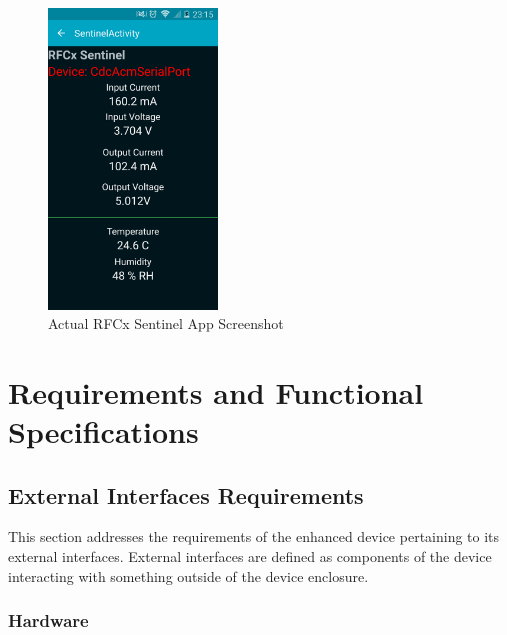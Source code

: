 \documentclass{article}
\begin{document}
{%

\begin{figure}[H]
	\centering
	\includegraphics[width=0.4\textwidth]{RFCxSentinelScreenshot}
	\caption{Actual RFCx Sentinel App Screenshot}
	\label{fig:sentscrn}
\end{figure}
\section{Requirements and Functional Specifications}
\subsection{External Interfaces Requirements}
This section addresses the requirements of the enhanced device pertaining to its external interfaces. External interfaces are defined as components of the device interacting with something outside of the device enclosure.
\subsubsection{Hardware}
\begin{enumerate}[align=left,leftmargin=*, labelindent= 0em, label=\textbf{Requirement \thesubsubsection.\arabic*.}, itemindent=0em]


\end{enumerate}}
\end{document}
